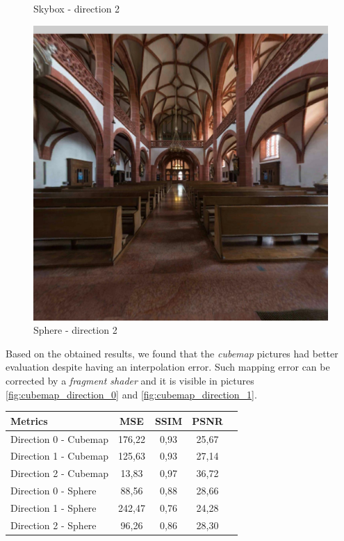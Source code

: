 \documentclass[12pt]{article}
\begin{document}
\begin{figure}[H]
\begin{minipage}[b]{0.3\textwidth}
    \caption{Skybox - direction 2}
    \label{fig:skybox_direction_2}
  \end{minipage}
  \hfill
  \begin{minipage}[b]{0.3\textwidth}
    \centering
    \includegraphics[width=1\textwidth]{../images/screenshots/Screenshot_5_Sphere.jpg}
    \caption{Sphere - direction 2}
    \label{fig:sphere_direction_2}
  \end{minipage}
\end{figure}

Based on the obtained results, we found that the \textit{cubemap} pictures had better evaluation despite having an interpolation error. Such mapping error can be corrected by a \textit{fragment shader} and it is visible in pictures \ref{fig:cubemap_direction_0} and \ref{fig:cubemap_direction_1}.

\begin{tabular}{l*{3}{c}r}
Metrics               & MSE & SSIM & PSNR \\
\hline
Direction 0 - Cubemap & 176,22 & 0,93 & 25,67 \\
Direction 1 - Cubemap & 125,63 & 0,93 & 27,14 \\
Direction 2 - Cubemap & 13,83 & 0,97 & 36,72 \\
Direction 0 - Sphere  & 88,56 & 0,88 & 28,66 \\
Direction 1 - Sphere  & 242,47 & 0,76 & 24,28 \\
Direction 2 - Sphere  & 96,26 & 0,86 & 28,30
\label{tab:metrics_results}
\end{tabular}
\end{document}
